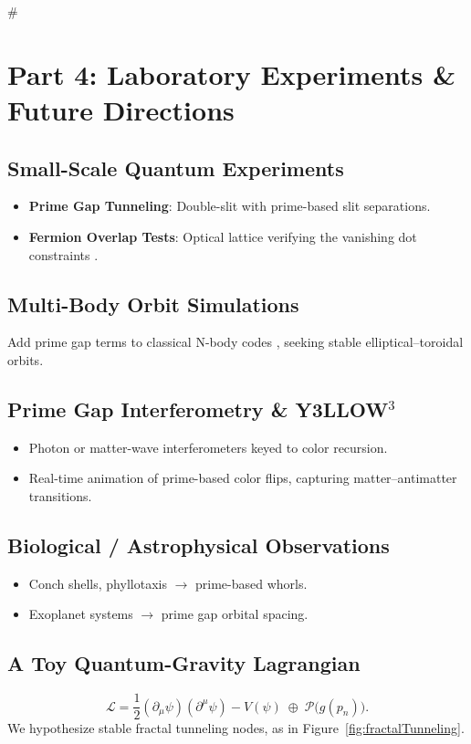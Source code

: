 #  \documentclass[11pt]{article}
\begin{document}
\section{Part 4: Laboratory Experiments \& Future Directions}
\label{part4}

\subsection{Small-Scale Quantum Experiments}
\begin{itemize}
    \item \textbf{Prime Gap Tunneling}: Double-slit with prime-based slit separations.
    \item \textbf{Fermion Overlap Tests}: Optical lattice verifying the vanishing dot constraints \cite{Pauli1925}.
\end{itemize}

\subsection{Multi-Body Orbit Simulations}
Add prime gap terms to classical N-body codes \cite{Poincare1892}, seeking stable elliptical–toroidal orbits.

\subsection{Prime Gap Interferometry \& Y3LLOW$^3$}
\begin{itemize}
    \item Photon or matter-wave interferometers keyed to color recursion.
    \item Real-time animation of prime-based color flips, capturing matter–antimatter transitions.
\end{itemize}

\subsection{Biological / Astrophysical Observations}
\begin{itemize}
    \item Conch shells, phyllotaxis $\rightarrow$ prime-based whorls.
    \item Exoplanet systems $\rightarrow$ prime gap orbital spacing.
\end{itemize}

\subsection{A Toy Quantum-Gravity Lagrangian}
\[
\mathcal{L} 
= \frac{1}{2}(\partial_\mu \psi)(\partial^\mu \psi) - V(\psi)
\;\oplus\;
\mathcal{P}\bigl(g(p_n)\bigr).
\]
We hypothesize stable fractal tunneling nodes, as in Figure~\ref{fig:fractalTunneling}.
\end{document}
